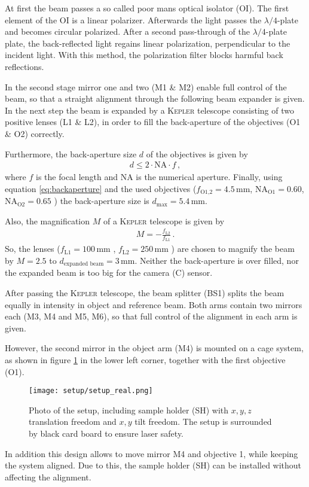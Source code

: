 \documentclass{article}
\begin{document}
At first the beam passes a so called poor mans optical isolator (OI). The first element of the OI is a linear polarizer. Afterwards the light passes the $\lambda/4$-plate and becomes circular polarized. After a second pass-through of the $\lambda/4$-plate plate, the back-reflected light regains linear polarization, perpendicular to the incident light. With this method, the polarization filter blocks harmful back reflections.

In the second stage mirror one and two (M1 \& M2) enable full control of the beam, so that a straight alignment through the following beam expander is given.
In the next step the beam is expanded by a \textsc{Kepler} telescope consisting of two positive lenses (L1 \& L2), in order to fill the back-aperture of the objectives (O1 \& O2) correctly.

Furthermore, the back-aperture size $d$ of the objectives is given by
\begin{align}
    d\leq2\cdot\text{NA}\cdot f\,, \label{eq:backaperture}
\end{align}
where $f$ is the focal length and $\text{NA}$ is the numerical aperture. Finally, using equation \ref{eq:backaperture} and the used objectives ($f_\text{O1,2}=4.5\,$mm, $\text{NA}_\text{O1}=0.60$, $\text{NA}_\text{O2}=0.65$ \cite{LCPlanFl}) the back-aperture size is $d_\text{max}=5.4\,$mm.

Also, the magnification $M$ of a \textsc{Kepler} telescope is given by
\begin{align}
    M=-\frac{f_\text{L2}}{f_\text{L1}}\,.
\end{align}
So, the lenses ($f_\text{L1}=100\,$mm \cite{LA1509}, $f_\text{L2}=250\,$mm \cite{LA1461}) are chosen to magnify the beam by $M=2.5$ to $d_\text{expanded beam}=3\,$mm. Neither the back-aperture is over filled, nor the expanded beam is too big for the camera (C) \cite{pointGrey} sensor.

After passing the \textsc{Kepler} telescope, the beam splitter (BS1) \cite{BS013} splits the beam equally in intensity in object and reference beam. Both arms contain two mirrors each (M3, M4 and M5, M6), so that full control of the alignment in each arm is given.

However, the second mirror in the object arm (M4) is mounted on a cage system, as shown in figure \ref{fig:real_setup} in the lower left corner, together with the first objective (O1).
\begin{figure}[ht]
    \centering
    \texttt{[image: setup/setup\_real.png]}
    \caption{Photo of the setup, including sample holder (SH) with $x, y, z$ translation freedom and $x,y$ tilt freedom. The setup is surrounded by black card board to ensure laser safety.}
    \label{fig:real_setup}
\end{figure}
In addition this design allows to move mirror M4 and objective 1, while keeping the system aligned. Due to this, the sample holder (SH) can be installed without affecting the alignment.
\end{document}
